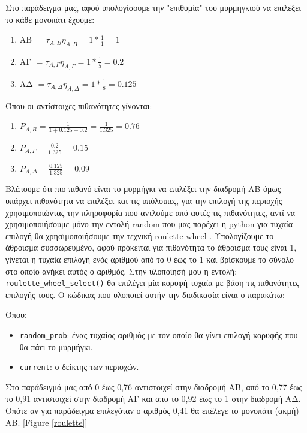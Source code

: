 Στο παράδειγμα μας, αφού υπολογίσουμε την "επιθυμία" του μυρμηγκιού να επιλέξει το κάθε μονοπάτι έχουμε:

\begin{enumerate}
    \item AΒ $= τ_{A,B}η_{A,B}=1*\frac{1}{1}=1$ 
    \item AΓ $= τ_{A,Γ}η_{A,Γ}=1*\frac{1}{5}=0.2$
    \item AΔ $= τ_{A,Δ}η_{A,Δ}=1*\frac{1}{8}=0.125$
\end{enumerate}

Όπου οι αντίστοιχες πιθανότητες γίνονται:

\begin{enumerate}
    \item $P_{A,B}=\frac{1}{1+0.125+0.2}=\frac{1}{1.325}=0.76$
    \item $P_{A,Γ}=\frac{0.2}{1.325}=0.15$
    \item $P_{A,Δ}=\frac{0.125}{1.325}=0.09$
\end{enumerate}

Βλέπουμε ότι πιο πιθανό είναι το μυρμήγκι να επιλέξει την διαδρομή ΑΒ όμως υπάρχει πιθανότητα να επιλέξει και τις υπόλοιπες, για την επιλογή της περιοχής χρησιμοποιώντας την πληροφορία που αντλούμε από αυτές τις πιθανότητες, αντί να χρησιμοποιήσουμε μόνο την εντολή random που μας παρέχει η python για τυχαία επιλογή θα χρησιμοποιήσουμε την τεχνική roulette wheel \cite{lipowski2012roulette}. Υπολογίζουμε το άθροισμα συσσωρευμένο, αφού πρόκειται για πιθανότητα το άθροισμα τους είναι 1, γίνεται η τυχαία επιλογή ενός αριθμού από το 0 έως το 1 και βρίσκουμε το σύνολο στο οποίο ανήκει αυτός ο αριθμός.
Στην υλοποίησή μου η εντολή: \verb|roulette_wheel_select()| θα επιλέγει μία κορυφή τυχαία με βάση τις πιθανότητες επιλογής τους. Ο κώδικας που υλοποιεί αυτήν την διαδικασία είναι ο παρακάτω: 

Όπου:
\begin{itemize}
    \item \verb|random_prob|: ένας τυχαίος αριθμός με τον οποίο θα γίνει επιλογή κορυφής που θα πάει το μυρμήγκι.
    \item \verb|current|: ο δείκτης των περιοχών.
\end{itemize}

Στο παράδειγμά μας από 0 έως 0,76 αντιστοιχεί στην διαδρομή ΑΒ, από το 0,77 έως το 0,91 αντιστοιχεί στην διαδρομή ΑΓ και απο το 0,92 έως το 1 στην διαδρομή ΑΔ. Οπότε αν για παράδειγμα επιλεγόταν ο αριθμός 0,41 θα επέλεγε το μονοπάτι (ακμή) ΑΒ. [Figure \ref{roulette}]
 
